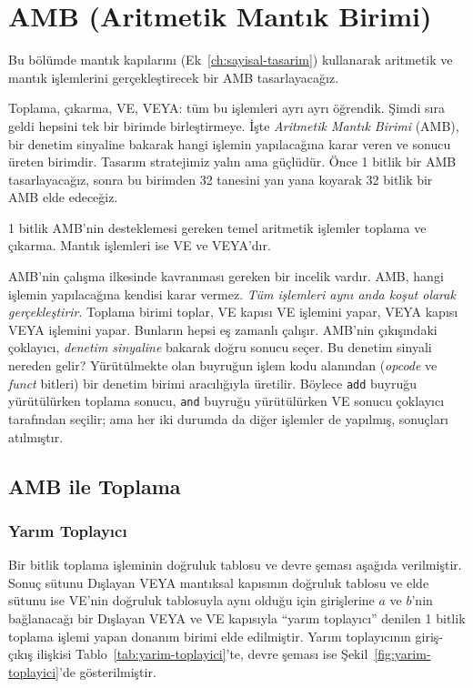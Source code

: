 \section{AMB (Aritmetik Mantık Birimi)}
\label{sec:amb}

Bu bölümde mantık kapılarını (Ek~\ref{ch:sayisal-tasarim}) kullanarak aritmetik ve mantık işlemlerini gerçekleştirecek bir AMB tasarlayacağız.

Toplama, çıkarma, VE, VEYA: tüm bu işlemleri ayrı ayrı öğrendik. Şimdi sıra geldi hepsini tek bir birimde birleştirmeye. İşte \emph{Aritmetik Mantık Birimi} (AMB), bir denetim sinyaline bakarak hangi işlemin yapılacağına karar veren ve sonucu üreten birimdir. Tasarım stratejimiz yalın ama güçlüdür. Önce 1 bitlik bir AMB tasarlayacağız, sonra bu birimden 32 tanesini yan yana koyarak 32 bitlik bir AMB elde edeceğiz.

1 bitlik AMB'nin desteklemesi gereken temel aritmetik işlemler toplama ve çıkarma. Mantık işlemleri ise VE ve VEYA'dır.

AMB'nin çalışma ilkesinde kavranması gereken bir incelik vardır. AMB, hangi işlemin yapılacağına kendisi karar vermez. \emph{Tüm işlemleri aynı anda koşut olarak gerçekleştirir}. Toplama birimi toplar, VE kapısı VE işlemini yapar, VEYA kapısı VEYA işlemini yapar. Bunların hepsi eş zamanlı çalışır. AMB'nin çıkışındaki çoklayıcı, \emph{denetim sinyaline} bakarak doğru sonucu seçer. Bu denetim sinyali nereden gelir? Yürütülmekte olan buyruğun işlem kodu alanından (\emph{opcode} ve \emph{funct} bitleri) bir denetim birimi aracılığıyla üretilir. Böylece \texttt{add} buyruğu yürütülürken toplama sonucu, \texttt{and} buyruğu yürütülürken VE sonucu çoklayıcı tarafından seçilir; ama her iki durumda da diğer işlemler de yapılmış, sonuçları atılmıştır.

\subsection{AMB ile Toplama}

\subsubsection{Yarım Toplayıcı}

Bir bitlik toplama işleminin doğruluk tablosu ve devre şeması aşağıda verilmiştir. Sonuç sütunu Dışlayan VEYA mantıksal kapısının doğruluk tablosu ve elde sütunu ise VE'nin doğruluk tablosuyla aynı olduğu için girişlerine $a$ ve $b$'nin bağlanacağı bir Dışlayan VEYA ve VE kapısıyla ``yarım toplayıcı'' denilen 1 bitlik toplama işlemi yapan donanım birimi elde edilmiştir. Yarım toplayıcının giriş-çıkış ilişkisi Tablo~\ref{tab:yarim-toplayici}'te, devre şeması ise Şekil~\ref{fig:yarim-toplayici}'de gösterilmiştir.

